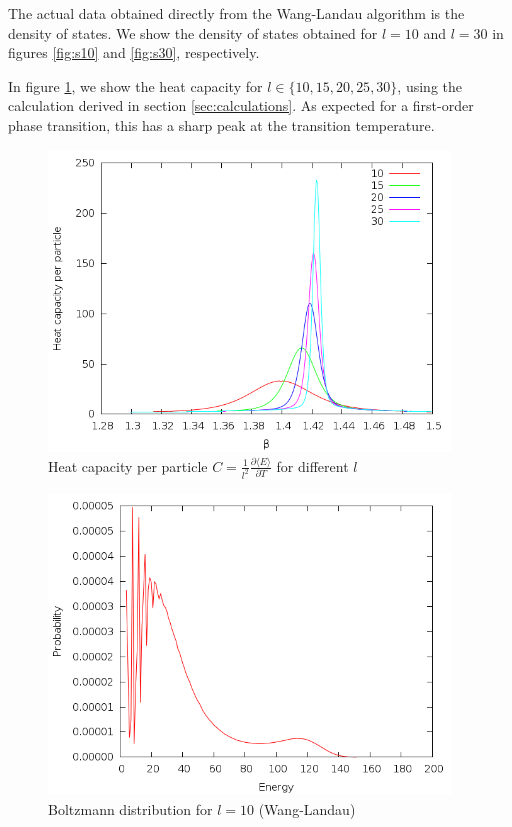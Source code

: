 \documentclass{article}
\begin{document}
The actual data obtained directly from the Wang-Landau algorithm is the density of states.
We show the density of states obtained for $l = 10$ and $l = 30$ in figures \ref{fig:s10} and \ref{fig:s30}, respectively.

In figure \ref{fig:capacity}, we show the heat capacity for $l \in\{10,15,20,25,30\}$, using the calculation derived in section \ref{sec:calculations}.
As expected for a first-order phase transition, this has a sharp peak at the transition temperature.

\begin{figure}[h]
\includegraphics[height=8cm]{../results/wanglandau/capacity.png}
\caption{Heat capacity per particle $C = \frac{1}{l^2}\frac{\partial\langle E\rangle}{\partial T}$ for different $l$}
\label{fig:capacity}
\end{figure}

\begin{figure}[h]
\includegraphics[height=8cm]{../results/wanglandau/b10.png}
\caption{Boltzmann distribution for $l = 10$ (Wang-Landau)}
\label{fig:b10}
\end{figure}
\end{document}

